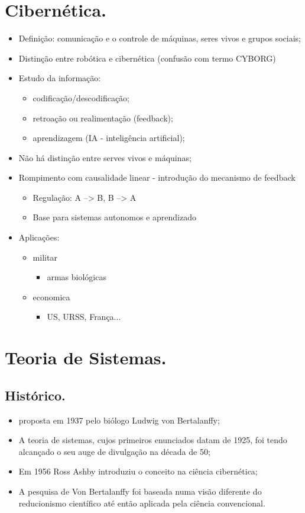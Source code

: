 \documentclass[a4paper,12pt]{article}
\begin{document}


\section{Cibernética.}

\begin{itemize}
\item Definição: comunicação e o controle de máquinas, seres vivos e grupos sociais;
\item Distinção entre robótica e cibernética (confusão com termo CYBORG)
\item Estudo da informação:
\begin{itemize}
\item codificação/descodificação;
\item retroação ou realimentação (feedback);
\item aprendizagem (IA - inteligência artificial);
\end{itemize}
\item Não há distinção entre serves vivos e máquinas;
\item Rompimento com causalidade linear - introdução do mecanismo de feedback
\begin{itemize}
\item Regulação: A --> B, B --> A
\item Base para sistemas autonomos e aprendizado
\end{itemize}
\item Aplicações:
\begin{itemize}
\item militar
\begin{itemize}
\item armas biológicas
\end{itemize}
\item economica
\begin{itemize}
\item US, URSS, França...
\end{itemize}
\end{itemize}
\end{itemize}

\section{Teoria de Sistemas.}

\subsection{Histórico.}
\begin{itemize}
\item proposta em 1937 pelo biólogo Ludwig von Bertalanffy;
\item A teoria de sistemas, cujos primeiros enunciados datam de 1925, foi  tendo alcançado o seu auge de divulgação na década de 50; 
\item Em 1956 Ross Ashby introduziu o conceito na ciência cibernética;
\item A pesquisa de Von Bertalanffy foi baseada numa visão diferente do reducionismo científico até então aplicada pela ciência convencional.
\end{itemize}
\end{document}
